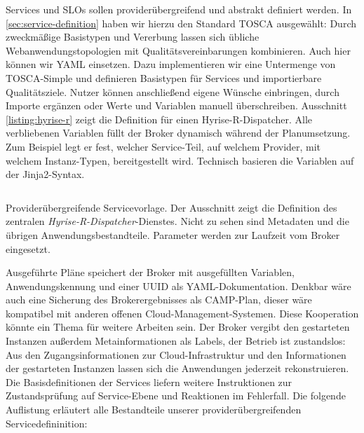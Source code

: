 Services und SLOs sollen providerübergreifend und abstrakt definiert werden. In \autoref{sec:service-definition} haben wir hierzu den Standard TOSCA ausgewählt: Durch zweckmäßige Basistypen und Vererbung lassen sich übliche Webanwendungstopologien mit Qualitätsvereinbarungen kombinieren. Auch hier können wir YAML einsetzen. Dazu implementieren wir eine Untermenge von TOSCA-Simple und definieren Basistypen für Services und importierbare Qualitätsziele. Nutzer können anschließend eigene Wünsche einbringen, durch Importe ergänzen oder Werte und Variablen manuell überschreiben. Ausschnitt \ref{listing:hyrise-r} zeigt die Definition für einen Hyrise-R-Dispatcher. Alle verbliebenen Variablen füllt der Broker dynamisch während der Planumsetzung. Zum Beispiel legt er fest, welcher Service-Teil, auf welchem Provider, mit welchem Instanz-Typen, bereitgestellt wird. Technisch basieren die Variablen auf der Jinja2-Syntax.

\begin{listing}[!h]	
	\inputminted[firstline=15]{yaml}{./src/hyrise-r.sample.yaml}
	\caption{Providerübergreifende Servicevorlage. Der Ausschnitt zeigt die Definition des zentralen \emph{Hyrise-R-Dispatcher}-Dienstes. Nicht zu sehen sind Metadaten und die übrigen Anwendungsbestandteile. Parameter werden zur Laufzeit vom Broker eingesetzt.}
	\label{listing:hyrise-r}
\end{listing}

Ausgeführte Pläne speichert der Broker mit ausgefüllten Variablen, Anwendungskennung und einer UUID als YAML-Dokumentation. Denkbar wäre auch eine Sicherung des Brokerergebnisses als CAMP-Plan, dieser wäre kompatibel mit anderen offenen Cloud-Management-Systemen. Diese Kooperation könnte ein Thema für weitere Arbeiten sein. Der Broker vergibt den gestarteten Instanzen außerdem Metainformationen als Labels, der Betrieb ist zustandslos: Aus den Zugangsinformationen zur Cloud-Infrastruktur und den Informationen der gestarteten Instanzen lassen sich die Anwendungen jederzeit rekonstruieren. Die Basisdefinitionen der Services liefern weitere Instruktionen zur Zustandsprüfung auf Service-Ebene und Reaktionen im Fehlerfall. Die folgende Auflistung erläutert alle Bestandteile unserer providerübergreifenden Servicedefininition:

